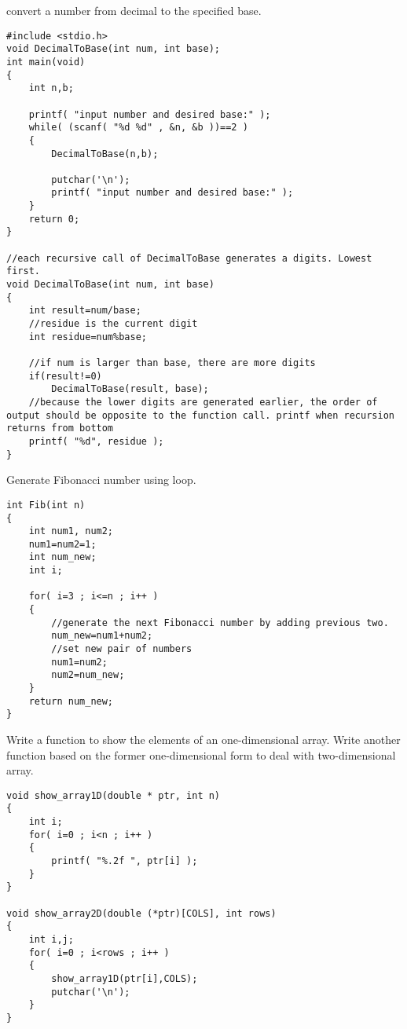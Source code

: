 \begin{question}
  convert a number from decimal to the specified base.
\end{question}
\begin{solution}
  \begin{verbatim}
#include <stdio.h>
void DecimalToBase(int num, int base);
int main(void)
{
	int n,b;

	printf( "input number and desired base:" );
	while( (scanf( "%d %d" , &n, &b ))==2 )
	{
		DecimalToBase(n,b);

		putchar('\n');
		printf( "input number and desired base:" );
	}
	return 0;
}

//each recursive call of DecimalToBase generates a digits. Lowest first.
void DecimalToBase(int num, int base)
{
	int result=num/base;
	//residue is the current digit
	int residue=num%base;

	//if num is larger than base, there are more digits
	if(result!=0)
		DecimalToBase(result, base);
	//because the lower digits are generated earlier, the order of output should be opposite to the function call. printf when recursion returns from bottom
	printf( "%d", residue );
}
  \end{verbatim}
\end{solution}
\begin{question}
  Generate Fibonacci number using loop.
\end{question}
\begin{solution}
  \begin{verbatim}
int Fib(int n)
{
	int num1, num2;
	num1=num2=1;
	int num_new;
	int i;
	
	for( i=3 ; i<=n ; i++ )
	{
		//generate the next Fibonacci number by adding previous two.
		num_new=num1+num2;
		//set new pair of numbers
		num1=num2;
		num2=num_new;
	}
	return num_new;
}
  \end{verbatim}
\end{solution}

\begin{question}
  Write a function to show the elements of an one-dimensional array. Write another function based on the former one-dimensional form to deal with two-dimensional array.
\end{question}
\begin{solution}
  \begin{verbatim}
void show_array1D(double * ptr, int n)
{
	int i;
	for( i=0 ; i<n ; i++ )
	{
		printf( "%.2f ", ptr[i] );
	}
}

void show_array2D(double (*ptr)[COLS], int rows)
{
	int i,j;
	for( i=0 ; i<rows ; i++ )
	{
		show_array1D(ptr[i],COLS);
		putchar('\n');
	}
}
  \end{verbatim}
\end{solution}


